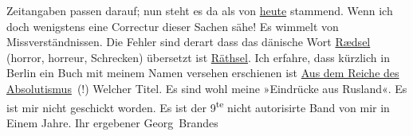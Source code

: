 \begin{ledgroupsized}[t]{13cm}
               Zeitangaben passen darauf; nun steht es da als von \uline{heute} stammend. Wenn ich doch wenigstens eine Correctur dieser Sachen sähe!
               Es wimmelt von Missverständnissen. Die Fehler sind derart dass das dänische Wort \uline{Rædsel} (horror, horreur, Schrecken) übersetzt ist \uline{Räthsel}.\hspace*{5em} Ich erfahre, dass kürzlich in
                  Berlin ein Buch mit meinem Namen versehen
               erschienen ist \uline{Aus dem Reiche des Absolutismus} (!) Welcher Titel. Es sind wohl meine »Eindrücke aus Rusland«. Es ist mir nicht geschickt worden. \introOben{}Es ist der 9\textsuperscript{te} nicht autorisirte Band
                  von mir in Einem Jahre.\introOben{}\pend
           \pstart Ihr ergebener \spacefill\mbox{Georg Brandes}\pend{}
         
         \endnumbering{}\end{ledgroupsized}  \newcommand{\dateiname}{L00600}\newcommand{\titel}{Georg Brandes an Arthur Schnitzler, 6. 10. 1896}\newcommand{\editorInnen}{Martin Anton Müller und Gerd-Hermann Susen}
      